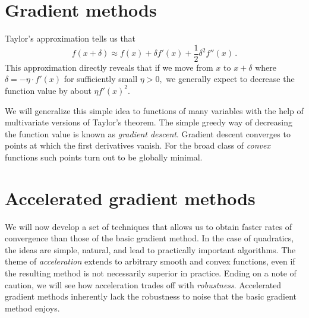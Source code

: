 \documentclass[12pt]{article}
\begin{document}
\maketitle



\pagebreak

\setcounter{tocdepth}{2}
\tableofcontents

\pagebreak

\part{Gradient methods}
\label{part:basic}

Taylor's approximation tells us that
\[
f(x+\delta)\approx f(x) + \delta f'(x) + \frac 12 \delta^2 f''(x)\,.
\]
This approximation directly reveals that if we move from $x$ to $x+\delta$ where
$\delta=-\eta \cdot f'(x)$ for sufficiently small $\eta>0,$ we generally expect
to decrease the function value by about $\eta f'(x)^2.$ 

We will generalize this simple idea to functions of many variables with the help
of multivariate versions of Taylor's theorem. The simple greedy way of
decreasing the function value is known as \emph{gradient descent}. Gradient
descent converges to points at which the first derivatives vanish. For the broad
class of \emph{convex} functions such points turn out to be globally minimal.







\pagebreak
\part{Accelerated gradient methods}
\label{part:accelerated}

We will now develop a set of techniques that allows us to obtain faster rates of
convergence than those of the basic gradient method. In the case of quadratics,
the ideas are simple, natural, and lead to practically important algorithms. The
theme of \emph{acceleration} extends to arbitrary smooth and convex functions,
even if the resulting method is not necessarily superior in practice.  Ending on
a note of caution, we will see how acceleration trades off with
\emph{robustness}. Accelerated gradient methods inherently lack the robustness
to noise that the basic gradient method enjoys.





\end{document}
